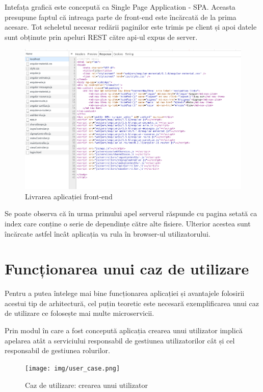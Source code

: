 \documentclass[12pt, a4paper, oneside, romanian]{teza-upb}
\begin{document}
Intefața grafică este concepută ca Single Page Application - SPA. Aceasta presupune faptul că intreaga parte de front-end este încărcată de la prima acesare. Tot scheletul necesar redării paginilor este trimis pe client și apoi datele sunt obținute prin apeluri REST către api-ul expus de server.

\begin{figure}[ht]
\centering
\includegraphics[scale=0.5]{img/spring-boot-spa-network.png}
\caption{Livrarea aplicației front-end}
\label{fig:arhi_componente}
\end{figure}

Se poate observa că în urma primului apel serverul răspunde cu pagina setată ca index care conține o serie de dependințe către alte fisiere. Ulterior acestea sunt încărcate astfel încât aplicația va rula în browser-ul utilizatorului. 

\newpage
\section{Funcționarea unui caz de utilizare}

Pentru a putea întelege mai bine funcționarea aplicației și avantajele folosirii acestui tip de arhitectură, cel puțin teoretic este necesară exemplificarea unui caz de utilizare ce folosește mai multe microservicii.

Prin modul în care a fost concepută aplicația crearea unui utilizator implică apelarea atât a serviciului responsabil de gestiunea utilizatorilor cât și cel responsabil de gestiunea rolurilor. 

\begin{figure}[ht]
\centering
\texttt{[image: img/user\_case.png]}
\caption{Caz de utilizare: crearea unui utilizator}
\label{fig:arhi_componente}
\end{figure}
\end{document}

